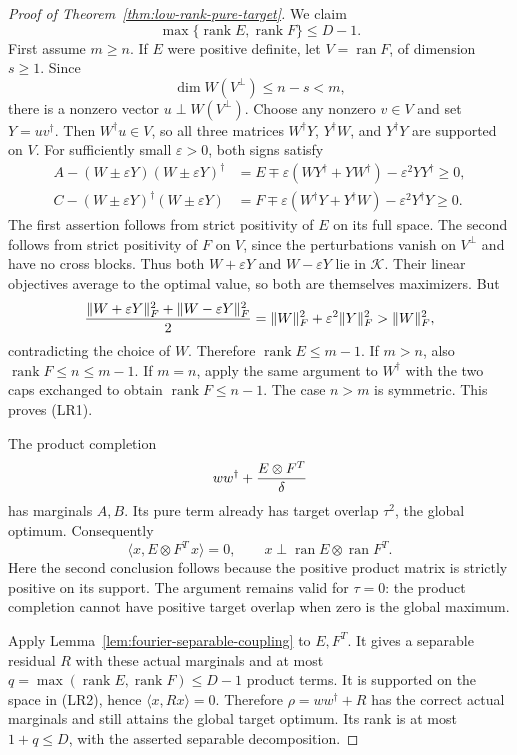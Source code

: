 \begin{proof}[Proof of Theorem~\ref{thm:low-rank-pure-target}]
We claim
\[
                 \max\{\operatorname{rank}E,\operatorname{rank}F\}
                    \le D-1.                                      \tag{LR1}
\]
First assume $m\ge n$. If $E$ were positive definite, let
$V=\operatorname{ran}F$, of dimension $s\ge1$. Since
\[
                 \dim W(V^\perp)\le n-s<m,
\]
there is a nonzero vector $u\perp W(V^\perp)$. Choose any nonzero
$v\in V$ and set $Y=uv^\dagger$. Then $W^\dagger u\in V$, so all
three matrices
$W^\dagger Y$, $Y^\dagger W$, and $Y^\dagger Y$ are supported on $V$.
For sufficiently small $\varepsilon>0$, both signs satisfy
\[
 \begin{split}
 A-(W\pm\varepsilon Y)(W\pm\varepsilon Y)^\dagger
    &=E\mp\varepsilon(WY^\dagger+YW^\dagger)
                           -\varepsilon^2YY^\dagger\ge0,\\
 C-(W\pm\varepsilon Y)^\dagger(W\pm\varepsilon Y)
    &=F\mp\varepsilon(W^\dagger Y+Y^\dagger W)
                           -\varepsilon^2Y^\dagger Y\ge0.
 \end{split}
\]
The first assertion follows from strict positivity of $E$ on its full
space. The second follows from strict positivity of $F$ on $V$, since
the perturbations vanish on $V^\perp$ and have no cross blocks. Thus
both $W+\varepsilon Y$ and $W-\varepsilon Y$ lie in $\mathcal K$.
Their linear objectives average to the optimal value, so both are
themselves maximizers. But
\[
 {\|W+\varepsilon Y\|_F^2+\|W-\varepsilon Y\|_F^2\over2}
       =\|W\|_F^2+\varepsilon^2\|Y\|_F^2>\|W\|_F^2,
\]
contradicting the choice of $W$. Therefore
$\operatorname{rank}E\le m-1$. If $m>n$, also
$\operatorname{rank}F\le n\le m-1$. If $m=n$, apply the same argument
to $W^\dagger$ with the two caps exchanged to obtain
$\operatorname{rank}F\le n-1$. The case $n>m$ is symmetric. This proves
(LR1).

The product completion
\[
                ww^\dagger+{E\otimes F^T\over\delta}
\]
has marginals $A,B$. Its pure term already has target overlap $\tau^2$,
the global optimum. Consequently
\[
       \langle x,E\otimes F^T\,x\rangle=0,
       \qquad
       x\perp\operatorname{ran}E\otimes\operatorname{ran}F^T.       \tag{LR2}
\]
Here the second conclusion follows because the positive product matrix
is strictly positive on its support. The argument remains valid for
$\tau=0$: the product completion cannot have positive target overlap
when zero is the global maximum.

Apply Lemma~\ref{lem:fourier-separable-coupling} to $E,F^T$. It gives a
separable residual $R$ with these actual marginals and at most
$q=\max(\operatorname{rank}E,\operatorname{rank}F)\le D-1$ product
terms. It is supported on the space in (LR2), hence
$\langle x,Rx\rangle=0$. Therefore $\rho=ww^\dagger+R$ has the correct
actual marginals and still attains the global target optimum. Its rank
is at most $1+q\le D$, with the asserted separable decomposition.
\end{proof}

